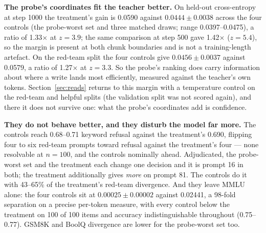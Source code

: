 \documentclass[11pt]{article}
\begin{document}
\textbf{The probe's coordinates fit the teacher better.} On held-out cross-entropy
at step 1000 the treatment's gain is 0.0590 against $0.0444 \pm 0.0038$ across the
four controls (the probe-worst set and three matched draws; range 0.0397--0.0475),
a ratio of 1.33$\times$ at $z = 3.9$; the same comparison at step 500 gave
1.42$\times$ ($z = 5.4$), so the margin is present at both chunk boundaries and is
not a training-length artefact. On the red-team
split the four controls give $0.0456 \pm 0.0037$ against 0.0579, a ratio of
1.27$\times$ at $z = 3.3$. So the probe's ranking does carry
information about where a write lands most efficiently, measured against the
teacher's own tokens. Section~\ref{sec:reads} returns to this margin with a temperature
control on the red-team and helpful splits (the validation split was not scored
again), and there it does not survive one: what the probe's coordinates add is
confidence.

\textbf{They do not behave better, and they disturb the model far more.} The
controls reach 0.68--0.71 keyword refusal against the treatment's 0.690, flipping
four to six red-team prompts toward refusal against the treatment's four --- none
resolvable at $n = 100$, and the controls nominally ahead. Adjudicated, the
probe-worst set and the treatment each change one decision and it is prompt 16 in
both; the treatment additionally gives \emph{more} on prompt 81. The controls do it
with 43--65\% of the treatment's red-team divergence. And they leave MMLU alone:
the four controls sit at $0.00025 \pm 0.00002$ against 0.02441, a 98-fold
separation on a precise per-token measure, with every control below the treatment
on 100 of 100 items and accuracy indistinguishable throughout (0.75--0.77). GSM8K
and BoolQ divergence are lower for the probe-worst set too.
\end{document}
